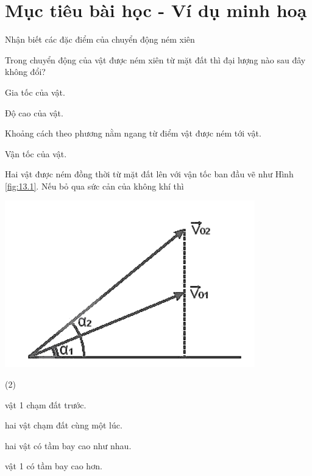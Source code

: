 \section{Mục tiêu bài học - Ví dụ minh hoạ}
\begin{dang}{Nhận biết các đặc điểm của chuyển động ném xiên}
	{Trong chuyển động của vật được ném xiên từ mặt đất thì đại lượng nào sau đây không đổi?
		\begin{mcq}
			\item Gia tốc của vật.
			\item Độ cao của vật.
			\item Khoảng cách theo phương nằm ngang từ điểm vật được ném tới vật.
			\item Vận tốc của vật.
		\end{mcq}
	}
{}
{Hai vật được ném đồng thời từ mặt đất lên với vận tốc ban đầu vẽ như Hình \ref{fig:13.1}. Nếu bỏ qua sức cản của không khí thì
	\begin{center}
		\includegraphics[width=0.3\linewidth]{../figs/VN10-2023-PH-TP013-1}
		\label{fig:13.1}
	\end{center}
	\begin{mcq}(2)
		\item vật 1 chạm đất trước.
		\item hai vật chạm đất cùng một lúc.
		\item hai vật có tầm bay cao như nhau.
		\item vật 1 có tầm bay cao hơn.
	\end{mcq}

}
{}
\end{dang}
